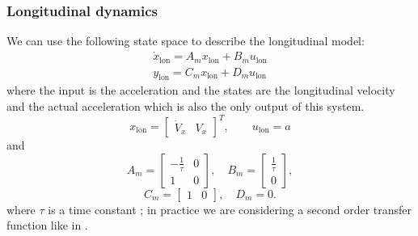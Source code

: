\documentclass[conference,11pt]{IEEEtran}
\renewcommand{\vec}[1]{\ensuremath{\boldsymbol{\mathit{#1}}}}
\begin{document}
\subsubsection{Longitudinal dynamics}
We can use the following state space to describe the longitudinal model:
\begin{equation}
\label{eqn:longi_dynamics_simple_model_ss}
\begin{array}{ll}
\dot{\vec{x}}_{\text{lon}} =\vec{A}_m \vec{x}_{\text{lon}}+ \vec{B_m}\vec{u}_{\text{lon}}\\
\vec{y}_{\text{lon}} =\vec{C_m} \vec{x}_{\text{lon}} + \vec{D_m} \vec{u}_{\text{lon}}
\end{array}
\end{equation}
where the input is the acceleration and the states are the longitudinal velocity and the actual acceleration which is also the only output of this system.
\begin{equation*}
\vec{x}_{\text{lon}} = \begin{bmatrix}
\dot{V}_x&V_x
\end{bmatrix}^T,
\qquad
\vec{u}_{\text{lon}} = a
\end{equation*}
and
\[ 
\vec{A_m}=\begin{bmatrix}
-\frac{1}{\tau}&0\\1&0
\end{bmatrix},
\quad
\vec{B_m}=\begin{bmatrix}
\frac{1}{\tau}\\
0
\end{bmatrix},
\]
\[
\vec{C_m}=\begin{bmatrix}
1&0
\end{bmatrix}, 
\quad
\vec{D_m}=0.
\]
where $\tau$ is a time constant \cite{long_tf}; in practice we are considering a second order transfer function like in \cite{longitudinal}.
\end{document}
